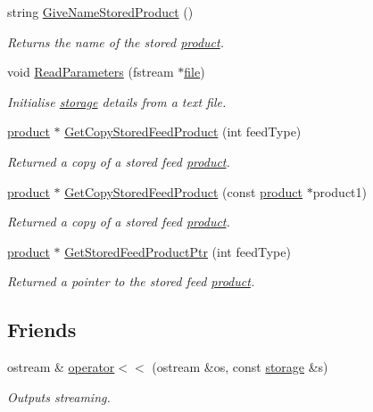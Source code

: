 \begin{DoxyCompactItemize}
string \hyperlink{classstorage_ae6dd348ff4165ddadea893d7f423dd9f}{GiveNameStoredProduct} ()
\begin{DoxyCompactList}\small\item\em Returns the name of the stored \hyperlink{classproduct}{product}. \item\end{DoxyCompactList}\item 
void \hyperlink{classstorage_a1dd69d2a46fa8359198d8c9d609ce50b}{ReadParameters} (fstream $\ast$\hyperlink{classbase_a3af52ee9891719d09b8b19b42450b6f6}{file})
\begin{DoxyCompactList}\small\item\em Initialise \hyperlink{classstorage}{storage} details from a text file. \item\end{DoxyCompactList}\item 
\hyperlink{classproduct}{product} $\ast$ \hyperlink{classstorage_a37cba1ed5c394ab20eeb55d90ccbecc3}{GetCopyStoredFeedProduct} (int feedType)
\begin{DoxyCompactList}\small\item\em Returned a copy of a stored feed \hyperlink{classproduct}{product}. \item\end{DoxyCompactList}\item 
\hyperlink{classproduct}{product} $\ast$ \hyperlink{classstorage_a1996eaa0b59046ab66d5be1713f90034}{GetCopyStoredFeedProduct} (const \hyperlink{classproduct}{product} $\ast$product1)
\begin{DoxyCompactList}\small\item\em Returned a copy of a stored feed \hyperlink{classproduct}{product}. \item\end{DoxyCompactList}\item 
\hyperlink{classproduct}{product} $\ast$ \hyperlink{classstorage_a1753e116e718886f484ce173cefa652f}{GetStoredFeedProductPtr} (int feedType)
\begin{DoxyCompactList}\small\item\em Returned a pointer to the stored feed \hyperlink{classproduct}{product}. \item\end{DoxyCompactList}\end{DoxyCompactItemize}
\subsection*{Friends}
\begin{DoxyCompactItemize}
\item 
ostream \& \hyperlink{classstorage_acb8dff690c7b169c45b30e4bf2dbe20a}{operator$<$$<$} (ostream \&os, const \hyperlink{classstorage}{storage} \&s)
\begin{DoxyCompactList}\small\item\em Outputs streaming. \item\end{DoxyCompactList}\end{DoxyCompactItemize}


